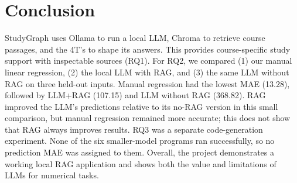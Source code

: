 \section{Conclusion}
StudyGraph uses Ollama to run a local LLM, Chroma to retrieve course passages, and the 4T's to shape its answers.
This provides course-specific study support with inspectable sources (RQ1).
For RQ2, we compared (1) our manual linear regression, (2) the local LLM with RAG, and (3) the same LLM without RAG on three held-out inputs.
Manual regression had the lowest MAE (13.28), followed by LLM+RAG (107.15) and LLM without RAG (368.82).
RAG improved the LLM's predictions relative to its no-RAG version in this small comparison, but manual regression remained more accurate;
this does not show that RAG always improves results.
RQ3 was a separate code-generation experiment.
None of the six smaller-model programs ran successfully, so no prediction MAE was assigned to them.
Overall, the project demonstrates a working local RAG application and shows both the value and limitations of LLMs for numerical tasks.
